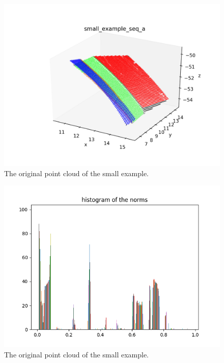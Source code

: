 \documentclass[a4paper,12pt]{article}
\begin{document}
 \begin{figure}[H]
  \begin{center}
      \includegraphics[scale=0.99]{small_example_seq_a.png}
\end{center}
\caption{The original point cloud of the small example.}
 \label{fig:sml_origin}
 \end{figure}





 \begin{figure}[H]
  \begin{center}
      \includegraphics[scale=0.6]{hist_of_abs_norm.png}
\end{center}
\caption{The original point cloud of the small example.}
 \label{fig:sml_origin}
 \end{figure}
 
\end{document}
